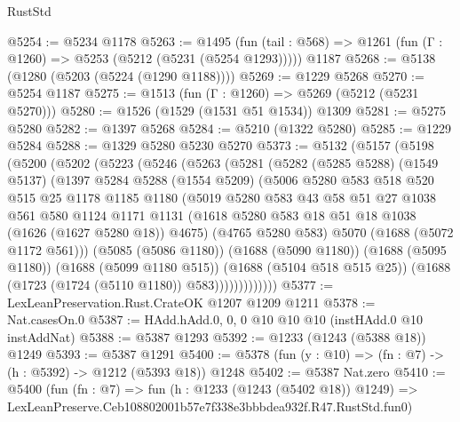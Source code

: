 \begin{lexlean}{RustStd}
\begin{coremodule}
@5254 := @5234 @1178
@5263 := @1495
    (fun (tail : @568) => @1261 (fun (Γ : @1260) => @5253 (@5212 (@5231 (@5254 @1293)))))
    @1187
@5268 := @5138 (@1280 (@5203 (@5224 (@1290 @1188))))
@5269 := @1229 @5268
@5270 := @5254 @1187
@5275 := @1513 (fun (Γ : @1260) => @5269 (@5212 (@5231 @5270)))
@5280 := @1526 (@1529 (@1531 @51 @1534)) @1309
@5281 := @5275 @5280
@5282 := @1397 @5268
@5284 := @5210 (@1322 @5280)
@5285 := @1229 @5284
@5288 := @1329 @5280 @5230 @5270
@5373 := @5132
    (@5157
      (@5198
        (@5200
          (@5202
            (@5223
              (@5246
                (@5263
                  (@5281
                    (@5282
                      (@5285 @5288)
                      (@1549 @5137)
                      (@1397
                        @5284
                        @5288
                        (@1554 @5209)
                        (@5006
                          @5280
                          @583
                          @518
                          @520
                          @515
                          @25
                          @1178
                          @1185
                          @1180
                          (@5019
                            @5280
                            @583
                            @43
                            @58
                            @51
                            @27
                            @1038
                            @561
                            @580
                            @1124
                            @1171
                            @1131
                            (@1618 @5280 @583 @18 @51 @18 @1038 (@1626 (@1627 @5280 @18)) @4675)
                            (@4765 @5280 @583)
                            @5070
                            (@1688 (@5072 @1172 @561)))
                          (@5085 (@5086 @1180))
                          (@1688 (@5090 @1180))
                          (@1688 (@5095 @1180))
                          (@1688 (@5099 @1180 @515))
                          (@1688 (@5104 @518 @515 @25))
                          (@1688 (@1723 (@1724 (@5110 @1180)) @583)))))))))))))
@5377 := LexLeanPreservation.Rust.CrateOK @1207 @1209 @1211
@5378 := Nat.casesOn.{0}
@5387 := HAdd.hAdd.{0, 0, 0} @10 @10 @10 (instHAdd.{0} @10 instAddNat)
@5388 := @5387 @1293
@5392 := @1233 (@1243 (@5388 @18)) @1249
@5393 := @5387 @1291
@5400 := @5378 (fun (y : @10) => (fn : @7) -> (h : @5392) -> @1212 (@5393 @18)) @1248
@5402 := @5387 Nat.zero
@5410 := @5400
    (fun (fn : @7) =>
    fun (h : @1233 (@1243 (@5402 @18)) @1249) =>
    LexLeanPreserve.Ceb108802001b57e7f338e3bbbdea932f.R47.RustStd.fun0)

\end{coremodule}
\end{lexlean}
